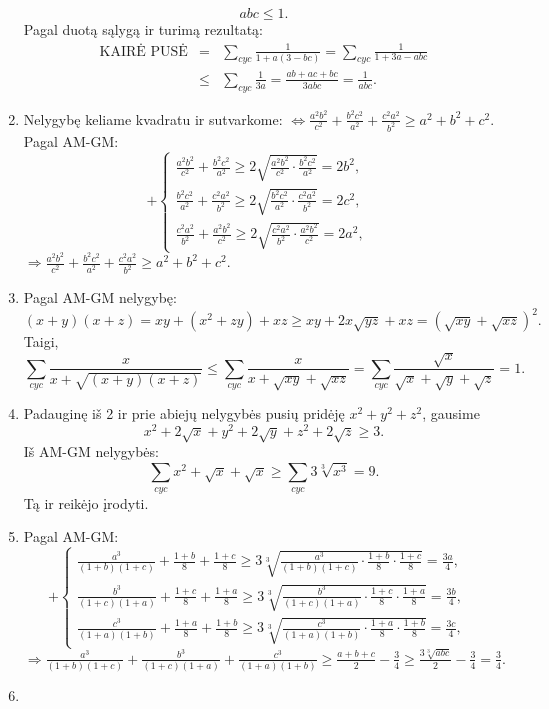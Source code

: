 \begin{enumerate}
$$abc\leq1.$$ Pagal duotą sąlygą ir turimą rezultatą:
\begin{eqnarray*}\text{KAIRĖ
PUSĖ}&=&\sum_{cyc}{\frac{1}{1+a(3-bc)}}=\sum_{cyc}{\frac{1}{1+3a-abc}}\\&\leq&\sum_{cyc}{\frac{1}{3a}}=\frac{ab+ac+bc}{3abc}=\frac{1}{abc}.\end{eqnarray*}
\item 
Nelygybę keliame kvadratu ir sutvarkome:
$\Leftrightarrow\frac{a^2b^2}{c^2}+\frac{b^2c^2}{a^2}+\frac{c^2a^2}{b^2}\geq
a^2+b^2+c^2.$ Pagal AM-GM: $$+\left\{\begin{array}{ll}
\frac{a^2b^2}{c^2}+\frac{b^2c^2}{a^2}\geq2\sqrt{\frac{a^2b^2}{c^2}\cdot\frac{b^2c^2}{a^2}}=2b^2,&\\
\frac{b^2c^2}{a^2}+\frac{c^2a^2}{b^2}\geq2\sqrt{\frac{b^2c^2}{a^2}\cdot\frac{c^2a^2}{b^2}}=2c^2,&\\
\frac{c^2a^2}{b^2}+\frac{a^2b^2}{c^2}\geq2\sqrt{\frac{c^2a^2}{b^2}\cdot\frac{a^2b^2}{c^2}}=2a^2,&\end{array}\right.
$$
$\Rightarrow\frac{a^2b^2}{c^2}+\frac{b^2c^2}{a^2}+\frac{c^2a^2}{b^2}\geq
a^2+b^2+c^2.$
\item 
Pagal AM-GM nelygybę: $$(x+y)(x+z)=xy+(x^2+zy)+xz\geq
xy+2x\sqrt{yz}+xz=(\sqrt{xy}+\sqrt{xz})^2.$$ Taigi,
$$\sum_{cyc}{\frac{x}{x+\sqrt{(x+y)(x+z)}}}\leq\sum_{cyc}{\frac{x}{x+\sqrt{xy}+\sqrt{xz}}}=
\sum_{cyc}{\frac{\sqrt{x}}{\sqrt{x}+\sqrt{y}+\sqrt{z}}}=1.$$
\item 
Padauginę iš 2 ir prie abiejų nelygybės pusių pridėję $x^2+y^2+z^2$,
gausime $$x^2+2\sqrt{x}+y^2+2\sqrt{y}+z^2+2\sqrt{z}\geq3.$$ Iš AM-GM
nelygybės:
$$\sum_{cyc}{x^2+\sqrt{x}+\sqrt{x}}\geq\sum_{cyc}{3\sqrt[3]{x^3}}=9.$$
Tą ir reikėjo įrodyti.
\item 
Pagal AM-GM: $$+\left\{\begin{array}{ll}
\frac{a^3}{(1+b)(1+c)}+\frac{1+b}{8}+\frac{1+c}{8}\geq3\sqrt[3]{\frac{a^3}{(1+b)(1+c)}\cdot\frac{1+b}{8}\cdot\frac{1+c}{8}}=\frac{3a}{4},&\\
\frac{b^3}{(1+c)(1+a)}+\frac{1+c}{8}+\frac{1+a}{8}\geq3\sqrt[3]{\frac{b^3}{(1+c)(1+a)}\cdot\frac{1+c}{8}\cdot\frac{1+a}{8}}=\frac{3b}{4},&\\
\frac{c^3}{(1+a)(1+b)}+\frac{1+a}{8}+\frac{1+b}{8}\geq3\sqrt[3]{\frac{c^3}{(1+a)(1+b)}\cdot\frac{1+a}{8}\cdot\frac{1+b}{8}}=\frac{3c}{4},&
\end{array}\right.$$
$\Rightarrow\frac{a^3}{(1+b)(1+c)}+\frac{b^3}{(1+c)(1+a)}+\frac{c^3}{(1+a)(1+b)}\geq\frac{a+b+c}{2}-\frac{3}{4}\geq\frac{3\sqrt[3]{abc}}{2}-\frac{3}{4}=\frac{3}{4}.$
\item 

\end{enumerate}
